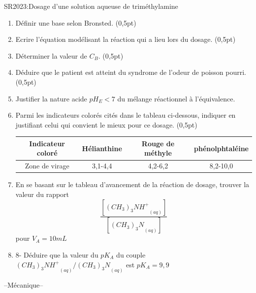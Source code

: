 \documentclass[12pt]{article}
\begin{document}
\begin{Box2}{SR2023:Dosage d’une solution aqueuse de triméthylamine}
  \begin{enumerate}
    \item Définir une base selon Bronsted. (0,5pt)
    \item Ecrire l’équation modélisant la réaction qui a lieu lors du dosage. (0,5pt)
    \item Déterminer la valeur de $C_B$. (0,5pt)
    \item Déduire que le patient est atteint du syndrome de l’odeur de poisson pourri. (0,5pt)
    \item Justifier la nature acide $pH_E < 7$ du mélange réactionnel à l’équivalence.
    \item Parmi les indicateurs colorés cités dans le tableau ci-dessous, indiquer en justifiant celui qui convient le
mieux pour ce dosage. (0,5pt)
\begin{center}
\begin{tabular}{ |c|c|c|c| } 
 \hline
  Indicateur coloré & Hélianthine & Rouge de méthyle & phénolphtaléine \\\hline 
  Zone de virage & 3,1-4,4 & 4,2-6,2 & 8,2-10,0 \\ 
 \hline
\end{tabular}
\end{center}
\item En se basant sur le tableau d’avancement de la réaction de dosage, trouver la valeur du rapport 
  $$\frac{[{(CH_3)_3NH^+}_{(aq)}]}{[{(CH_3)_3N}_{(aq)}]}$$ pour $V_A = 10mL$
\item 8- Déduire que la valeur du $pK_A$ du couple ${(CH_3)_3NH^+}_{(aq)} / {(CH_3)_3N}_{(aq)} $ est $pK_A = 9,9$
\end{enumerate}

\end{Box2}
\vspace{2cm}
\begin{center}
 \hrulefill
  \Large{--Mécanique--}
\hrulefill\\

\end{center}
\end{document}
